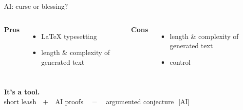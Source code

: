 \documentclass[aspectratio=1610,11pt]{beamer}
\newcommand{\aimedal}{\,[AI]}
\begin{document}
\begin{frame}{AI: curse or blessing?}
\vspace{4pt}
\begin{columns}[T,onlytextwidth]
{\large\color{vertexgreen!60!black}\bfseries Pros}
\begin{itemize}
\item \LaTeX{} typesetting
\item length \& complexity of generated text
\end{itemize}
{\large\color{vertexred}\bfseries Cons}
\begin{itemize}
\item length \& complexity of generated text
\item control
\end{itemize}
\end{columns}
\vspace{8pt}
\hspace*{0.9cm}{\color{KULblauw3a}\rule{0.82\paperwidth}{1.1pt}}
\vfill
\begin{center}
{\Large\color{KULblauw3b}\bfseries It's a tool.}\\[8pt]
{\normalsize short leash\ \ $+$\ \ AI proofs\ \ $=$\ \ argumented conjecture\ \aimedal}
\end{center}
\vfill
\end{frame}
\end{document}
